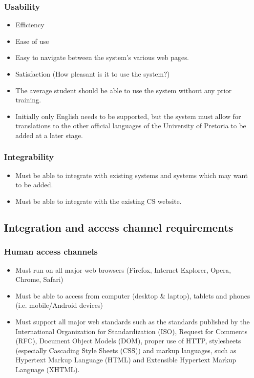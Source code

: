 \documentclass[12pt, oneside]{article}
\begin{document}
		\subsubsection{Usability}
			\begin{itemize}
				\item Efficiency
				\item Ease of use
				\item Easy to navigate between the system's various web pages.
				\item Satisfaction (How pleasant is it to use the system?)
				\item The average student should be able to use the system without any prior training.
				\item Initially only English needs to be supported, but the system must allow for translations to the other official languages of the University of Pretoria to be added at a later stage.
			\end{itemize}
		\subsubsection{Integrability}
				\begin{itemize}
					\item Must be able to integrate with existing systems and systems which may want to be added.
					\item Must be able to integrate with the existing CS website.
				\end{itemize}
				
	\subsection{Integration and access channel requirements}
				\subsubsection{Human access channels}
				\begin{itemize}
					\item Must run on all major web browsers (Firefox, Internet Explorer, Opera, Chrome, Safari)
					\item Must be able to access from computer (desktop \& laptop), tablets and phones (i.e. mobile/Android devices)
					\item Must support all major web standards such as the standards published by the International Organization for Standardization (ISO), Request for Comments (RFC), Document Object Models (DOM), proper use of HTTP, stylesheets (especially Cascading Style Sheets (CSS)) and markup languages, such as Hypertext Markup Language (HTML) and Extensible Hypertext Markup Language (XHTML).
				\end{itemize}
\end{document}

